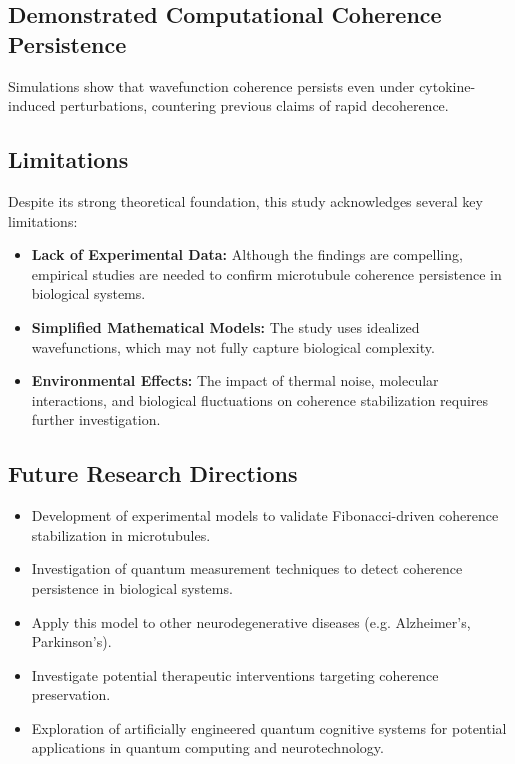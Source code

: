 \documentclass[entropy,article,submit,oneauthor,pdftex]{Definitions/mdpi}
\begin{document}
\subsection{Demonstrated Computational Coherence Persistence} 
Simulations show that wavefunction coherence persists even under cytokine-induced perturbations, countering previous claims of rapid decoherence.

\subsection{Limitations}
Despite its strong theoretical foundation, this study acknowledges several key limitations:
\begin{itemize}
    \item \textbf{Lack of Experimental Data:} Although the findings are compelling, empirical studies are needed to confirm microtubule coherence persistence in biological systems.
    \item \textbf{Simplified Mathematical Models:} The study uses idealized wavefunctions, which may not fully capture biological complexity.
    \item \textbf{Environmental Effects:} The impact of thermal noise, molecular interactions, and biological fluctuations on coherence stabilization requires further investigation.
\end{itemize}

\subsection{Future Research Directions}
\begin{itemize}
    \item Development of experimental models to validate Fibonacci-driven coherence stabilization in microtubules.
    \item Investigation of quantum measurement techniques to detect coherence persistence in biological systems.
    \item Apply this model to other neurodegenerative diseases (e.g. Alzheimer's, Parkinson's).
    \item Investigate potential therapeutic interventions targeting coherence preservation.
    \item Exploration of artificially engineered quantum cognitive systems for potential applications in quantum computing and neurotechnology.
\end{itemize}
\end{document}
